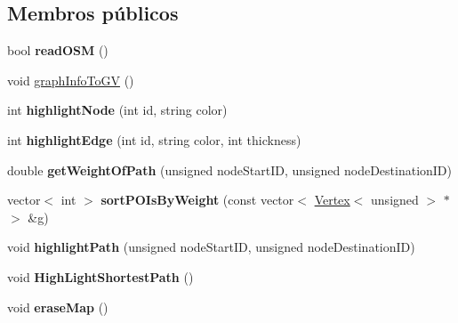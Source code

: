 \subsection*{Membros públicos}
\begin{DoxyCompactItemize}
\item 
\hypertarget{class_easy_pilot_a64817c638d599dc3b8d9c833a7ce33fc}{}bool {\bfseries read\+O\+S\+M} ()\label{class_easy_pilot_a64817c638d599dc3b8d9c833a7ce33fc}

\item 
void \hyperlink{class_easy_pilot_a1390dbc215f3376a9954f89c52c3cc32}{graph\+Info\+To\+G\+V} ()
\item 
\hypertarget{class_easy_pilot_a640864406bf361499e587764410c87e2}{}int {\bfseries highlight\+Node} (int id, string color)\label{class_easy_pilot_a640864406bf361499e587764410c87e2}

\item 
\hypertarget{class_easy_pilot_a1a020d88e153d05a4e68a258b420eaa3}{}int {\bfseries highlight\+Edge} (int id, string color, int thickness)\label{class_easy_pilot_a1a020d88e153d05a4e68a258b420eaa3}

\item 
\hypertarget{class_easy_pilot_a93f291c61c81fc5dbb46bfff63eb65ed}{}double {\bfseries get\+Weight\+Of\+Path} (unsigned node\+Start\+I\+D, unsigned node\+Destination\+I\+D)\label{class_easy_pilot_a93f291c61c81fc5dbb46bfff63eb65ed}

\item 
\hypertarget{class_easy_pilot_a457e255691b25063652a589b598e1ae5}{}vector$<$ int $>$ {\bfseries sort\+P\+O\+Is\+By\+Weight} (const vector$<$ \hyperlink{class_vertex}{Vertex}$<$ unsigned $>$ $\ast$ $>$ \&g)\label{class_easy_pilot_a457e255691b25063652a589b598e1ae5}

\item 
\hypertarget{class_easy_pilot_a4e992fbc635e8505a3b9596a017455d4}{}void {\bfseries highlight\+Path} (unsigned node\+Start\+I\+D, unsigned node\+Destination\+I\+D)\label{class_easy_pilot_a4e992fbc635e8505a3b9596a017455d4}

\item 
\hypertarget{class_easy_pilot_a8470b9065378edc35c6ef71fff45affb}{}void {\bfseries High\+Light\+Shortest\+Path} ()\label{class_easy_pilot_a8470b9065378edc35c6ef71fff45affb}

\item 
\hypertarget{class_easy_pilot_ae885f727e3d2af5713f795a5b94d1472}{}void {\bfseries erase\+Map} ()\label{class_easy_pilot_ae885f727e3d2af5713f795a5b94d1472}


\end{DoxyCompactItemize}
